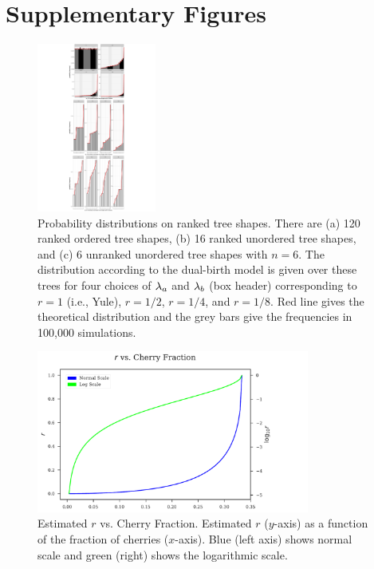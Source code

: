\section{Supplementary Figures}
\begin{figure} %
\centering
\includegraphics[width=0.35\textwidth]{figs/dualbirth-tree-prob-dists}
\caption[Probability distributions on ranked tree shapes]
{Probability distributions on ranked tree shapes. There are (a) 120 ranked ordered tree shapes, (b) 16 ranked unordered tree shapes, and (c) 6 unranked unordered tree shapes with $n=6$. The distribution according to the dual-birth model is given over these trees for four choices of $\lambda_a$ and $\lambda_b$ (box header) corresponding to $r=1$ (i.e., Yule), $r=1/2$, $r=1/4$, and $r=1/8$. Red line gives the theoretical distribution and the grey bars give the frequencies in 100,000 simulations.}
\label{fig:dualbirth-tree-prob-dists}
\end{figure}

\begin{figure} %
\centering
\includegraphics[width=0.8\textwidth]{figs/dualbirth-sup-cvsr}
\caption[Estimated $r$ vs. Cherry Fraction]
{Estimated $r$ vs. Cherry Fraction. Estimated $r$ ($y$-axis) as a function of the fraction of cherries ($x$-axis). Blue (left axis) shows normal scale and green (right) shows the logarithmic scale.}
\label{fig:dualbirth-sup-cvsr}
\end{figure}

